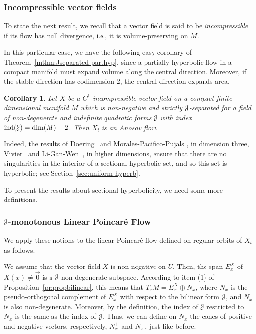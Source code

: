 \documentclass[12pt,reqno]{amsart}
\numberwithin{equation}{section}
\theoremstyle{plain}
\newtheorem{maincorollary}[maintheorem]{Corollary}
\theoremstyle{definition}
\newcommand{\indi}{\operatorname{ind}}
\newcommand{\J}{\EuScript{J}}
\begin{document}
\subsubsection{Incompressible vector fields}
To state the next result, we recall that a vector field is
said to be \emph{incompressible} if its flow has null
divergence, i.e., it is volume-preserving on $M$.

In this particular case, we have the following easy
corollary of Theorem~\ref{mthm:Jseparated-parthyp}, since a
partially hyperbolic flow in a compact
manifold %
must expand volume along the central direction. Moreover, if
the stable direction has codimension $2$, the central
direction expands area.
\begin{maincorollary}
  \label{mcor:incompress-anosov}
  Let $X$ be a $C^1$ incompressible vector field on a
  compact finite dimensional manifold $M$ which is
  non-negative and strictly $\J$-separated for a field 
  of non-degenerate and indefinite quadratic forms $\J$ with
  index $\indi(\J)= \dim(M)-2$.  Then $X_t$ is an Anosov
  flow.
\end{maincorollary}
Indeed, the results of Doering~\cite{Do87} and
Morales-Pacifico-Pujals \cite{MPP99}, in dimension three,
Vivier~\cite{Viv03} and Li-Gan-Wen~\cite{LGW05}, in
higher dimensions, ensure that there are no singularities in
the interior of a sectional-hyperbolic set, and so this set
is hyperbolic; see Section~\ref{sec:uniform-hyperb}.

To present the results about sectional-hyperbolicity, we
need some more definitions.

\subsubsection{$\J$-monotonous Linear Poincar\'e Flow}
\label{sec:j-monotonous-linear}

We apply these notions to the linear Poincar\'e flow defined
on regular orbits of $X_t$ as follows.

We assume that the vector field $X$ is non-negative on $U$.
Then, the span $E^X_x$ of $X(x)\neq\vec0$ is a
$\J$-non-degenerate subspace.  According to item (1) of
Proposition~\ref{pr:propbilinear}, this means that
$T_xM=E_x^X\oplus N_x$, where $N_x$ is the pseudo-orthogonal
complement of $E^X_x$ with respect to the bilinear form
$\J$, and $N_x$ is also non-degenerate. Moreover, by the
definition, the index of $\J$ restricted to $N_x$ is the
same as the index of $\J$. Thus, we can define on $N_x$ the
cones of positive and negative vectors, respectively,
$N_x^+$ and $N_x^-$, just like before.
\end{document}
